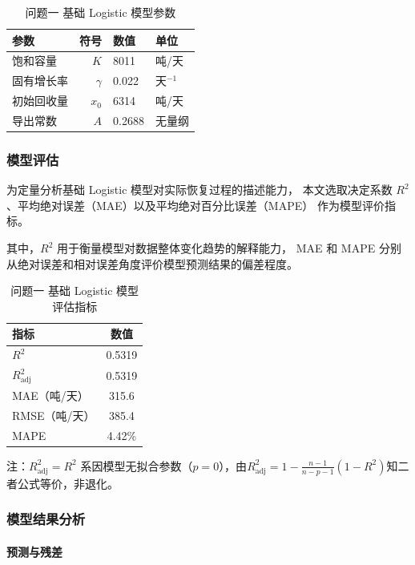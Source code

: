 \documentclass[12pt,a4paper]{ctexart}
\begin{document}
\begin{table}[htbp]
\centering

\begin{tabular}{lrll}
\toprule
参数 & 符号 & 数值 & 单位 \\
\midrule
饱和容量      & $K$      & 8011   & 吨/天 \\
固有增长率    & $\gamma$ & 0.022  & 天$^{-1}$ \\
初始回收量    & $x_0$    & 6314   & 吨/天 \\
导出常数      & $A$      & 0.2688 & 无量纲 \\
\bottomrule
\end{tabular}
\caption{问题一 基础 Logistic 模型参数}
\label{tab:q1_params}
\end{table}

\subsubsection{模型评估}

为定量分析基础 Logistic 模型对实际恢复过程的描述能力，
本文选取决定系数 $R^2$、平均绝对误差（MAE）以及平均绝对百分比误差（MAPE）
作为模型评价指标。

其中，$R^2$ 用于衡量模型对数据整体变化趋势的解释能力，
MAE 和 MAPE 分别从绝对误差和相对误差角度评价模型预测结果的偏差程度。

\begin{table}[htbp]
\centering

\begin{tabular}{lc}
\toprule
指标 & 数值 \\
\midrule
$R^2$          & 0.5319 \\
$R_{\text{adj}}^2$ & 0.5319 \\
MAE（吨/天）   & 315.6 \\
RMSE（吨/天）  & 385.4 \\
MAPE          & 4.42\% \\
\bottomrule
\end{tabular}
\caption{问题一 基础 Logistic 模型评估指标}
\label{tab:q1_metrics}
{\small 注：$R_{\text{adj}}^2 = R^2$ 系因模型无拟合参数（$p=0$），由$R_{\text{adj}}^2 = 1 - \frac{n-1}{n-p-1}(1-R^2)$知二者公式等价，非退化。}
\end{table}

\subsubsection{模型结果分析}
\paragraph{预测与残差}
\end{document}
